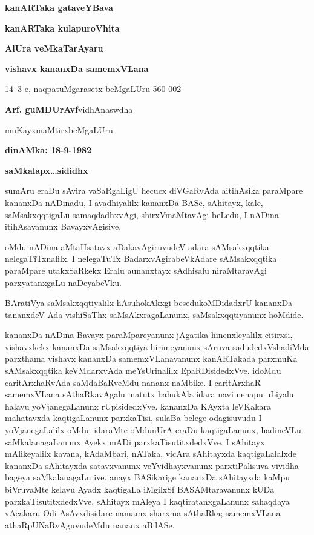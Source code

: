 \documentclass[11pt,a4size]{article}
\begin{document}
\fontsize{15pt}{15pt}\selectfont
\centerline{\textbf{\Huge kanARTaka gataveYBava}}

\vfill
\begin{center}
\textbf{\large kanARTaka kulapuroVhita}

\textbf{\LARGE AlUra veMkaTarAyaru}
\vfill

\textbf{\LARGE vishavx kananxDa samemxVLana}

\smallskip
{\LARGE 14--3 e, naqpatuMgarasetx beMgaLUru 560 002}
\end{center}


\newpage

\noindent
\textbf{\Large Arf. guMDUrAvf}\hfill vidhAnaswdha

\noindent
muKayxmaMtirx\hfill beMgaLUru

\medskip
\hfill \textbf{dinAMka: 18-9-1982}

\bigskip
\hfill \textbf{\huge saMkalapx\ldots sididhx}

\bigskip
\bigskip
\noindent
sumAru eraDu sAvira vaSaRgaLigU hecucx diVGaRvAda aitihAsika paraMpare
kananxDa nADinadu, I avadhiyalilx kananxDa BASe, sAhitayx, kale,
saMsakxqqtigaLu samaqdadhxvAgi, shirxVmaMtavAgi beLedu, I nADina
itihAsavanunx BavayxvAgisive.

\medskip
\noindent
oMdu nADina aMtaHsatavx aDakavAgiruvudeV adara sAMsakxqqtika
nelegaTiTxnalilx. I nelegaTuTx BadarxvAgirabeVkAdare sAMsakxqqtika
paraMpare utakxSaRkekx Eralu aunanxtayx sAdhisalu niraMtaravAgi
parxyatanxgaLu naDeyabeVku.

\medskip
\noindent
BAratiVya saMsakxqqtiyalilx hAsuhokAkxgi besedukoMDidadxrU kananxDa
tananxdeV Ada vishiSaThx saMsAkxragaLanunx, saMsakxqqtiyanunx hoMdide.

\medskip
\noindent
kananxDa nADina Bavayx paraMpareyanunx jAgatika hinenxleyalilx
citirxsi, vishavxkekx kananxDa saMsakxqqtiya hirimeyanunx sAruva
sadudedxVshadiMda parxthama vishavx kananxDa samemxVLanavanunx
kanARTakada parxmuKa sAMsakxqqtika keVMdarxvAda meYsUrinalilx
EpaRDisidedxVve. idoMdu caritArxhaRvAda saMdaBaRveMdu nananx
naMbike. I caritArxhaR samemxVLana sAthaRkavAgalu matutx bahukAla
idara navi nenapu uLiyalu halavu yoVjanegaLanunx
rUpisidedxVve. kananxDa KAyxta leVKakara mahatavxda kaqtigaLanunx
parxkaTisi, sulaBa belege odagisuvudu I yoVjanegaLalilx oMdu. idaraMte
oMdunUrA eraDu kaqtigaLanunx, hadineVLu saMkalanagaLanunx Ayekx mADi
parxkaTisutitxdedxVve. I sAhitayx mAlikeyalilx kavana, kAdaMbari,
nATaka, vicAra sAhitayxda kaqtigaLalalxde kananxDa sAhitayxda
satavxvanunx veYvidhayxvanunx parxtiPalisuva vividha bageya
saMkalanagaLu ive. anayx BASikarige kananxDa sAhitayxda kaMpu
biVruvaMte kelavu Ayadx kaqtigaLa iMgilxSf BASAMtaravanunx kUDa
parxkaTisutitxdedxVve. sAhitayx mAleya I kaqtiratanxgaLanunx sahaqdaya
vAcakaru Odi AsAvxdisidare namamx sharxma sAthaRka; samemxVLana
athaRpUNaRvAguvudeMdu nananx aBilASe.
\end{document}
